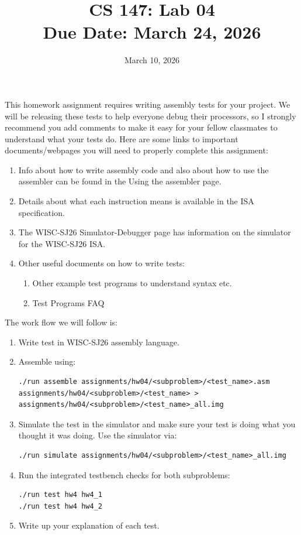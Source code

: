 \documentclass[12pt]{article}
\title{CS 147: Lab 04 \\ Due Date: March 24, 2026}
\author{}
\date{March 10, 2026}
\begin{document}
\maketitle

This homework assignment requires writing assembly tests for your project. We will be releasing these
tests to help everyone debug their processors, so I strongly recommend you add comments to make
it easy for your fellow classmates to understand what your tests do. Here are some links to important
documents/webpages you will need to properly complete this assignment:

\begin{enumerate}
\item
Info about how to write assembly code and also about how to use the assembler can be found in
the Using the assembler page.
\item Details about what each instruction means is available in the ISA specification.
\item The WISC-SJ26 Simulator-Debugger page has information on the simulator for the WISC-SJ26
ISA.
\item Other useful documents on how to write tests:
\begin{enumerate}
\item Other example test programs to understand syntax etc.
\item Test Programs FAQ
\end{enumerate}

\end{enumerate}

The work flow we will follow is:
\begin{enumerate}
\item Write test in WISC-SJ26 assembly language.
\item Assemble using:
\begin{lstlisting}[basicstyle=\ttfamily\small,breaklines=true]
./run assemble assignments/hw04/<subproblem>/<test_name>.asm assignments/hw04/<subproblem>/<test_name> > assignments/hw04/<subproblem>/<test_name>_all.img
\end{lstlisting}
\item Simulate the test in the simulator and make sure your test is doing what you thought it was doing.
Use the simulator via:
\begin{verbatim}
./run simulate assignments/hw04/<subproblem>/<test_name>_all.img
\end{verbatim}
\item Run the integrated testbench checks for both subproblems:
\begin{verbatim}
./run test hw4 hw4_1
./run test hw4 hw4_2
\end{verbatim}
\item Write up your explanation of each test.
\end{enumerate}
\end{document}
